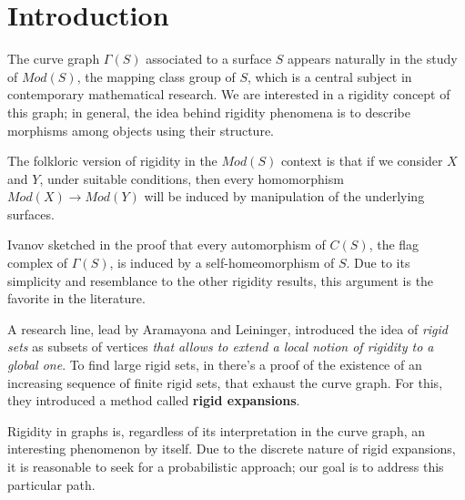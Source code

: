 \chapter*{Introduction} %

\label{Intro} %



The curve graph $\Gamma(S)$ associated to a surface $S$ appears naturally in the study of $Mod(S)$, the mapping class group of $S$, which is a central subject in contemporary mathematical research. We are interested in a rigidity concept of this graph; in general, the idea behind rigidity phenomena is to describe morphisms among objects using their structure.

The folkloric version of rigidity in the $Mod(S)$ context is that if we consider $X$ and $Y$, under suitable conditions, then every homomorphism $Mod(X) \to Mod(Y)$ will be induced by manipulation of the underlying surfaces.

Ivanov sketched in \cite[Ivanov 97]{celebratedIvanov} the proof that every automorphism of $C(S)$, the flag complex of $\Gamma(S)$, is induced by a self-homeomorphism of $S$. Due to its simplicity and resemblance to the other rigidity results, this argument is the favorite in the literature.

A research line, lead by Aramayona and Leininger, introduced the idea of \textit{rigid sets} as subsets of vertices \textit{that allows to extend a local notion of rigidity to a global one}. To find large rigid sets, in \cite[Aramayona, Leininger 16]{finiteRigidSetsJA} there's a proof of the existence of an increasing sequence of finite rigid sets, that exhaust the curve graph. For this, they introduced a method called \textbf{rigid expansions}.

Rigidity in graphs is, regardless of its interpretation in the curve graph, an interesting phenomenon by itself. Due to the discrete nature of rigid expansions, it is reasonable to seek for a probabilistic approach; our goal is to address this particular path.

